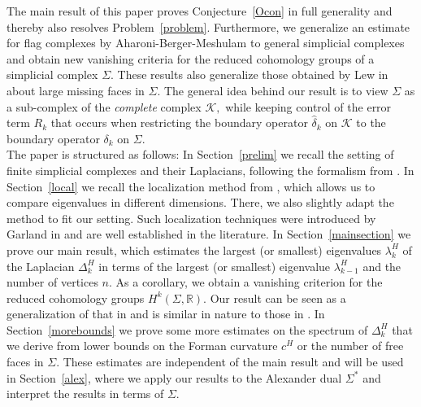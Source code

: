 \documentclass[10pt]{amsart}
\theoremstyle{definition}
\begin{document}
The main result of this paper proves Conjecture~\ref{Ocon} in full generality and thereby also resolves Problem~\ref{problem}. Furthermore, we generalize an estimate for flag complexes by Aharoni-Berger-Meshulam \cite{AharoniBergerMeshulam} to general simplicial complexes and obtain new vanishing criteria for the reduced cohomology groups of a simplicial complex $\Sigma.$ These results also generalize those obtained by Lew in \cite{lewgaps} about large missing faces in $\Sigma.$ The general idea behind our result is to view $\Sigma$ as a sub-complex of the \textit{complete} complex $\mathcal{K},$ while keeping control of the error term $R_k$ that occurs when restricting the boundary operator $\widehat\delta_k$ on $\mathcal{K}$ to the boundary operator $\delta_k$ on $\Sigma.$\\
The paper is structured as follows: In Section~\ref{prelim} we recall the setting of finite  simplicial complexes and their Laplacians, following the formalism from \cite{BK}. In Section~\ref{local} we recall the localization method from \cite{AharoniBergerMeshulam}, which allows us to compare eigenvalues in different dimensions. There, we also slightly adapt the method to fit our setting. Such localization techniques were introduced by Garland in \cite{Garland} and are well established in the literature. In Section~\ref{mainsection} we prove our main result, which estimates the largest (or smallest) eigenvalues $\lambda^H_k$ of the Laplacian $\Delta^H_k$ in terms of the largest (or smallest) eigenvalue $\lambda_{k-1}^H$ and the number of vertices $n.$ As a corollary, we obtain a vanishing criterion for the reduced cohomology groups $H^k(\Sigma,\mathbb{R}).$ Our result can be seen as a generalization of that in \cite{AharoniBergerMeshulam} and is similar in nature to those in \cite{ShuklaYogeshwaran}. In Section~\ref{morebounds} we prove some more estimates on the spectrum of $\Delta^H_k$ that we derive from lower bounds on the Forman curvature $c^H$ or the number of free faces in $\Sigma.$ These estimates are independent of the main result and will be used in Section~\ref{alex}, where we apply our results to the Alexander dual $\Sigma^*$ and interpret the results in terms of $\Sigma.$ 
\end{document}
